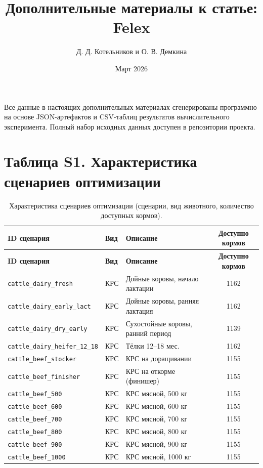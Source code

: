 \documentclass[11pt]{article}
\title{Дополнительные материалы к статье: Felex}
\author{Д. Д. Котельников и О. В. Демкина}
\date{Март 2026}
\begin{document}
\maketitle

Все данные в настоящих дополнительных материалах сгенерированы программно на основе JSON-артефактов и CSV-таблиц результатов вычислительного эксперимента. Полный набор исходных данных доступен в репозитории проекта.

\section*{Таблица S1. Характеристика сценариев оптимизации}
\begin{longtable}{lllc}
\caption{Характеристика сценариев оптимизации (сценарии, вид животного, количество доступных кормов).}\label{tab:s1_scenarios} \\
\toprule
\textbf{ID сценария} & \textbf{Вид} & \textbf{Описание} & \textbf{Доступно кормов} \\
\midrule
\endfirsthead
\toprule
\textbf{ID сценария} & \textbf{Вид} & \textbf{Описание} & \textbf{Доступно кормов} \\
\midrule
\endhead
\bottomrule
\endfoot
\bottomrule
\endlastfoot
\texttt{cattle\_dairy\_fresh} & КРС & Дойные коровы, начало лактации & 1162 \\
\texttt{cattle\_dairy\_early\_lact} & КРС & Дойные коровы, ранняя лактация & 1162 \\
\texttt{cattle\_dairy\_dry\_early} & КРС & Сухостойные коровы, ранний период & 1139 \\
\texttt{cattle\_dairy\_heifer\_12\_18} & КРС & Тёлки 12--18 мес. & 1162 \\
\texttt{cattle\_beef\_stocker} & КРС & КРС на доращивании & 1155 \\
\texttt{cattle\_beef\_finisher} & КРС & КРС на откорме (финишер) & 1155 \\
\texttt{cattle\_beef\_500} & КРС & КРС мясной, 500 кг & 1155 \\
\texttt{cattle\_beef\_600} & КРС & КРС мясной, 600 кг & 1155 \\
\texttt{cattle\_beef\_700} & КРС & КРС мясной, 700 кг & 1155 \\
\texttt{cattle\_beef\_800} & КРС & КРС мясной, 800 кг & 1155 \\
\texttt{cattle\_beef\_900} & КРС & КРС мясной, 900 кг & 1155 \\
\texttt{cattle\_beef\_1000} & КРС & КРС мясной, 1000 кг & 1155 \\

\end{longtable}
\end{document}
